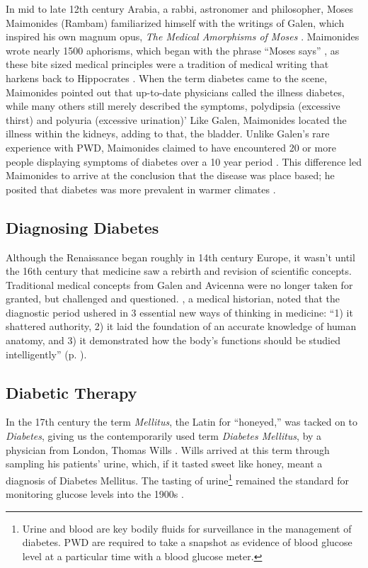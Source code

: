 \documentclass[12pt]{article}
\begin{document}
In mid to late 12th century Arabia, a rabbi, astronomer and philosopher, Moses Maimonides (Rambam) familiarized himself with the writings of Galen, which inspired his own magnum opus, \textit{The Medical Amorphisms of Moses} \citep{maimonides_1989_medical}. Maimonides wrote nearly 1500 aphorisms, which began with the phrase ``Moses says'' \citep{maimonides_1989_medical}, as these bite sized medical principles were a tradition of medical writing that harkens back to Hippocrates \citep{sanders_2001_philatelic}. When the term diabetes came to the scene, Maimonides pointed out that up-to-date physicians called the illness diabetes, while many others still merely described the symptoms, polydipsia (excessive thirst) and polyuria (excessive urination)' Like Galen, Maimonides located the illness within the kidneys, adding to that, the bladder.  Unlike Galen's rare experience with PWD, Maimonides claimed to have encountered 20 or more people displaying symptoms of diabetes over a 10 year period \citep{maimonides_1989_medical}. This difference led Maimonides to arrive at the conclusion that the disease was place based; he posited that diabetes was more prevalent in warmer climates \citep{maimonides_1989_medical}.

\subsection{Diagnosing Diabetes} 

Although the Renaissance began roughly in 14th century Europe, it wasn't until the 16th century that medicine saw a rebirth and revision of scientific concepts. Traditional medical concepts from Galen and Avicenna were no longer taken for granted, but challenged and questioned. \citet{osler_1921_evolution}, a medical historian, noted that the diagnostic period ushered in 3 essential new ways of thinking in medicine: ``1) it shattered authority, 2) it laid the foundation of an accurate knowledge of human anatomy, and 3) it demonstrated how the body's functions should be studied intelligently'' (p.  ). 

\subsection{Diabetic Therapy}
In the 17th century the term \textit{Mellitus}, the Latin for ``honeyed,'' was tacked on to \textit{Diabetes}, giving us the contemporarily used term \textit{Diabetes Mellitus}, by a physician from London, Thomas Wills \citep{sattley_history_1996}. Wills arrived at this term through sampling his patients' urine, which, if it tasted sweet like honey, meant a diagnosis of Diabetes Mellitus. The tasting of urine\footnote{Urine and blood are key bodily fluids for surveillance in the management of diabetes. PWD are required to take a snapshot as evidence of blood glucose level at a particular time with a blood glucose meter.} remained the standard for monitoring glucose levels into the 1900s \citep{sattley_history_1996}. 
\end{document}
